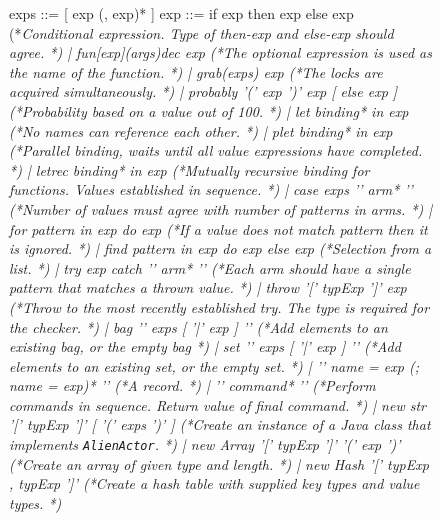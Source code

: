 \documentclass[5p,times]{elsarticle}
\begin{document}
\begin{figure}
\begin{ESL}
exps    ::= [ exp (, exp)* ]
exp     ::= if exp then exp else exp                            (*\rmfamily\it Conditional expression. Type of then-exp and else-exp should agree. *)
        |  fun[exp](args)dec exp                               (*\rmfamily\it The optional expression is used as the name of the function. *)
        |  grab(exps) exp                                      (*\rmfamily\it The locks are acquired simultaneously. *)
        |  probably '(' exp ')' exp [ else exp ]               (*\rmfamily\it Probability based on a value out of 100. *)
        |  let binding* in exp                                 (*\rmfamily\it No names can reference each other. *)
        |  plet binding* in exp                                (*\rmfamily\it Parallel binding, waits until all value expressions have completed. *)
        |  letrec binding* in exp                              (*\rmfamily\it Mutually recursive binding for functions. Values established in sequence. *)
        |  case exps '{' arm* '}'                              (*\rmfamily\it Number of values must agree with number of patterns in arms. *)
        |  for pattern in exp do exp                           (*\rmfamily\it If a value does not match pattern then it is ignored. *)
        |  find pattern in exp do exp else exp                 (*\rmfamily\it Selection from a list. *)
        |  try exp catch '{' arm* '}'                          (*\rmfamily\it Each arm should have a single pattern that matches a thrown value. *)
        |  throw '[' typExp ']' exp                            (*\rmfamily\it Throw to the most recently established try. The type is required for the checker. *)
        |  bag '{' exps [ '|' exp ] '}'                        (*\rmfamily\it Add elements to an existing bag, or the empty bag *)
        |  set '{' exps [ '|' exp ] '}'                        (*\rmfamily\it Add elements to an existing set, or the empty set. *)
        |  '{' name = exp (; name = exp)* '}'                  (*\rmfamily\it A record. *)
        |  '{' command* '}'                                    (*\rmfamily\it Perform commands in sequence. Return value of final command. *)
        |  new str '[' typExp ']' [ '(' exps ')' ]             (*\rmfamily\it Create an instance of a Java class that implements {\tt AlienActor}. *)
        |  new Array '[' typExp ']' '(' exp ')'                (*\rmfamily\it Create an array of given type and length. *)
        |  new Hash '[' typExp , typExp ']'                    (*\rmfamily\it Create a hash table with supplied key types and value types. *)

\end{ESL}
\end{figure}
\end{document}
